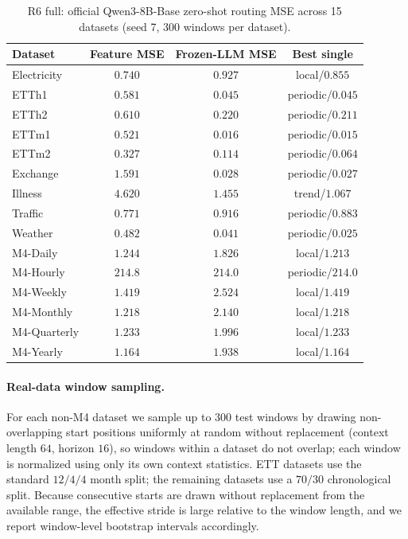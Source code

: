 \documentclass{article}
\begin{document}
\begin{table}[h]
\centering
\small
\begin{tabular}{lccc}
\toprule
Dataset & Feature MSE & Frozen-LLM MSE & Best single \\
\midrule
Electricity & $\mathbf{0.740}$ & $0.927$ & local/$0.855$ \\
ETTh1 & $0.581$ & $\mathbf{0.045}$ & periodic/$0.045$ \\
ETTh2 & $0.610$ & $\mathbf{0.220}$ & periodic/$0.211$ \\
ETTm1 & $0.521$ & $\mathbf{0.016}$ & periodic/$0.015$ \\
ETTm2 & $0.327$ & $0.114$ & periodic/$0.064$ \\
Exchange & $1.591$ & $\mathbf{0.028}$ & periodic/$0.027$ \\
Illness & $4.620$ & $\mathbf{1.455}$ & trend/$1.067$ \\
Traffic & $\mathbf{0.771}$ & $0.916$ & periodic/$0.883$ \\
Weather & $0.482$ & $\mathbf{0.041}$ & periodic/$0.025$ \\
M4-Daily & $\mathbf{1.244}$ & $1.826$ & local/$1.213$ \\
M4-Hourly & $214.8$ & $\mathbf{214.0}$ & periodic/$214.0$ \\
M4-Weekly & $\mathbf{1.419}$ & $2.524$ & local/$1.419$ \\
M4-Monthly & $\mathbf{1.218}$ & $2.140$ & local/$1.218$ \\
M4-Quarterly & $\mathbf{1.233}$ & $1.996$ & local/$1.233$ \\
M4-Yearly & $\mathbf{1.164}$ & $1.938$ & local/$1.164$ \\
\bottomrule
\end{tabular}
\caption{R6 full: official Qwen3-8B-Base zero-shot routing MSE across 15
datasets (seed 7, 300 windows per dataset).}
\label{tab:real8}
\end{table}

\paragraph{Real-data window sampling.}
For each non-M4 dataset we sample up to $300$ test windows by drawing
non-overlapping start positions uniformly at random without replacement
(context length $64$, horizon $16$), so windows within a dataset do not
overlap; each window is normalized using only its own context statistics.
ETT datasets use the standard $12/4/4$ month split; the remaining datasets use
a $70/30$ chronological split.  Because consecutive starts are drawn without
replacement from the available range, the effective stride is large relative
to the window length, and we report window-level bootstrap intervals
accordingly.
\end{document}
